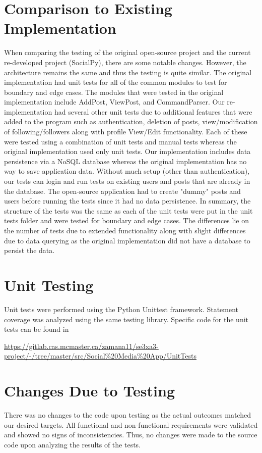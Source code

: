 \documentclass[12pt, titlepage]{article}
\begin{document}
\section{Comparison to Existing Implementation}
When comparing the testing of the original open-source project and the current re-developed project (SocialPy), there are some notable changes. However, the architecture remains the same and thus the testing is quite similar. The original implementation had unit tests for all of the common modules to test for boundary and edge cases. The modules that were tested in the original implementation include AddPost, ViewPost, and CommandParser. Our re-implementation had several other unit tests due to additional features that were added to the program such as authentication, deletion of posts, view/modification of following/followers along with profile View/Edit functionality. Each of these were tested using a combination of unit tests and manual tests whereas the original implementation used only unit tests. Our implementation includes data persistence via a NoSQL database whereas the original implementation has no way to save application data. Without much setup (other than authentication), our tests can login and run tests on existing users and posts that are already in the database. The open-source application had to create "dummy" posts and users before running the tests since it had no data persistence. In summary, the structure of the tests was the same as each of the unit tests were put in the unit tests folder and were tested for boundary and edge cases. The differences lie on the number of tests due to extended functionality along with slight differences due to data querying as the original implementation did not have a database to persist the data.

\section{Unit Testing}
Unit tests were performed using the Python Unittest framework. Statement coverage was analyzed using the same testing library. Specific code for the unit tests can be found in 

\href{https://gitlab.cas.mcmaster.ca/zamana11/se3xa3-project/-/tree/master/src/Social\%20Media\%20App/UnitTests}{https://gitlab.cas.mcmaster.ca/zamana11/se3xa3-project/-/tree/master/src/Social\%20Media\%20App/UnitTests} 


\section{Changes Due to Testing}
There was no changes to the code upon testing as the actual outcomes matched our desired targets. All functional and non-functional requirements were validated and showed no signs of inconsistencies. Thus, no changes were made to the source code upon analyzing the results of the tests.
\end{document}
